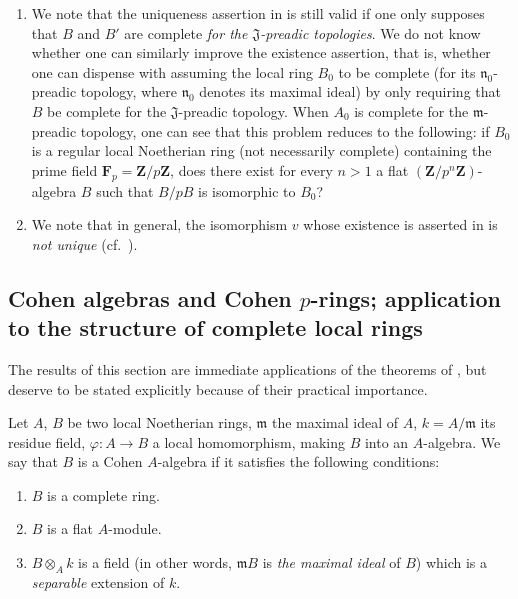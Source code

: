 \begin{remarks}[19.7.3]
\label{0.19.7.3}
\begin{enumerate}
  \item[\rm(i)] We note that the uniqueness assertion in  is still valid if one only supposes that $B$ and $B'$ are complete \emph{for the $\mathfrak{J}$-preadic topologies}.
We do not know whether one can similarly improve the existence assertion, that is, whether one can dispense with assuming the local ring $B_0$ to be complete (for its $\mathfrak{n}_0$-preadic topology, where $\mathfrak{n}_0$ denotes its maximal ideal) by only requiring that $B$ be complete for the $\mathfrak{J}$-preadic topology.
When $A_0$ is complete for the $\mathfrak{m}$-preadic topology, one can see that this problem reduces to the following: if $B_0$ is a regular local Noetherian ring (not necessarily complete) containing the prime field $\mathbf{F}_p=\mathbf{Z}/p\mathbf{Z}$, does there exist for every $n>1$ a flat $(\mathbf{Z}/p^n\mathbf{Z})$-algebra $B$ such that $B/pB$ is isomorphic to $B_0$?
  \item[\rm(ii)] We note that in general, the isomorphism $v$ whose existence is asserted in  is \emph{not unique} (cf.\ ).
\end{enumerate}
\end{remarks}

\subsection{Cohen algebras and Cohen $p$-rings; application to the structure of complete local rings}
\label{subsection:0.19.8}
\label{0.19.8}

The results of this section are immediate applications of the theorems of , but deserve to be stated explicitly because of their practical importance.

\begin{definition}[19.8.1]
\label{0.19.8.1}
Let $A$, $B$ be two local Noetherian rings, $\mathfrak{m}$ the maximal ideal of $A$, $k=A/\mathfrak{m}$ its residue field, $\varphi:A\to B$ a local homomorphism, making $B$ into an $A$-algebra.
We say that $B$ is a Cohen $A$-algebra if it satisfies the following conditions:
\begin{enumerate}
  \item[\rm(i)] $B$ is a complete ring.
  \item[\rm(ii)] $B$ is a flat $A$-module.
  \item[\rm(iii)] $B\otimes_A k$ is a field \textup{(in other words, $\mathfrak{m}B$ is \emph{the maximal ideal} of $B$)} which is a \emph{separable} extension of $k$.
\end{enumerate}
\end{definition}

